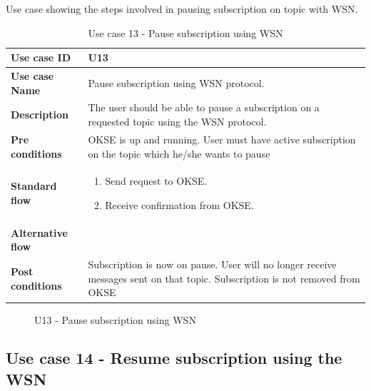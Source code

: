 Use case showing the steps involved in pausing subscription on topic with WSN. 

\begin{table}[ht!]
\centering
\begin{tabular}{|l|p{5cm}|}
\hline
\textbf{Use case ID} & U13 \\ \hline
\textbf{Use case Name} & Pause subscription using WSN protocol.\\ \hline
\textbf{Description} & The user should be able to pause a subscription on a requested topic using the WSN protocol. \\ \hline
\textbf{Pre conditions} & OKSE is up and running. User must have active subscription on the topic which he/she wants to pause\\ \hline
\textbf{Standard flow} & \begin{enumerate}
\item Send request to OKSE. 
\item Receive confirmation from OKSE.
\end{enumerate} \\ \hline
\textbf{Alternative flow} & \\ \hline
\textbf{Post conditions} & Subscription is now on pause. User will no longer receive messages sent on that topic. Subscription is not removed from OKSE\\ \hline
\end{tabular}
\caption{Use case 13 - Pause subscription using WSN}
\label{uc13}
\end{table}

\begin{center}
  \begin{figure}[ht!]
    \caption{U13 - Pause subscription using WSN}
    \label{fig:u13}
  \end{figure}
\end{center}

\clearpage

\subsection{Use case 14 - Resume subscription using the WSN}
\label{subsec:requirements_engineering-use_cases-resume_sub_wsn}

